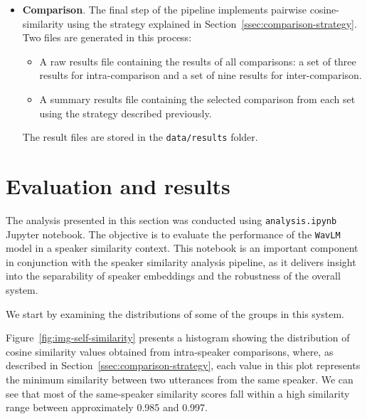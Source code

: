 \documentclass[conference]{IEEEtran}
\begin{document}
\begin{itemize}
		\item \textbf{Comparison}. The final step of the pipeline implements pairwise cosine-similarity using the strategy explained in Section~\ref{ssec:comparison-strategy}. Two files are generated in this process:
		
		\begin{itemize}
			\item A raw results file containing the results of all comparisons: a set of three results for intra-comparison and a set of nine results for inter-comparison.
			\item A summary results file containing the selected comparison from each set using the strategy described previously.
		\end{itemize}
		
		The result files are stored in the \texttt{data/results} folder.
	\end{itemize}
	
	
	\section{Evaluation and results}
	\label{scn:evaluation-and-results}
	
	The analysis presented in this section was conducted using \texttt{analysis.ipynb} Jupyter notebook. The objective is to evaluate the performance of the \texttt{WavLM} model in a speaker similarity context. 
	This notebook is an important component in conjunction with the speaker similarity analysis pipeline, as it delivers insight into the separability of speaker embeddings and the robustness of the overall system.
	
	We start by examining the distributions of some of the groups in this system. 
	
	Figure~\ref{fig:img-self-similarity} presents a histogram showing the distribution of cosine similarity values obtained from intra-speaker comparisons, where, as described in Section~\ref{ssec:comparison-strategy}, each value in this plot represents the minimum similarity between two utterances from the same speaker. We can see that most of the same-speaker similarity scores fall within a high similarity range between approximately 0.985 and 0.997. 
	
\end{document}
